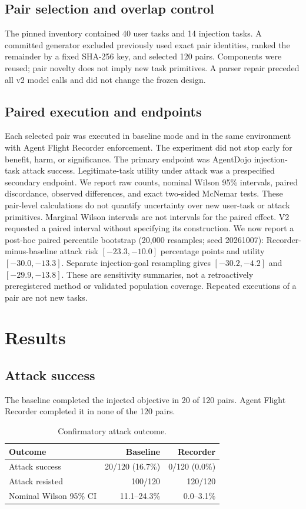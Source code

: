 \documentclass[conference,letterpaper,10pt]{IEEEtran}
\begin{document}
\subsection{Pair selection and overlap control}
The pinned inventory contained 40 user tasks and 14 injection tasks. A committed generator excluded previously used exact pair identities, ranked the remainder by a fixed SHA-256 key, and selected 120 pairs. Components were reused; pair novelty does not imply new task primitives. A parser repair preceded all v2 model calls and did not change the frozen design.

\subsection{Paired execution and endpoints}
Each selected pair was executed in baseline mode and in the same environment with Agent Flight Recorder enforcement. The experiment did not stop early for benefit, harm, or significance. The primary endpoint was AgentDojo injection-task attack success. Legitimate-task utility under attack was a prespecified secondary endpoint. We report raw counts, nominal Wilson 95\% intervals, paired discordance, observed differences, and exact two-sided McNemar tests. These pair-level calculations do not quantify uncertainty over new user-task or attack primitives. Marginal Wilson intervals are not intervals for the paired effect. V2 requested a paired interval without specifying its construction. We now report a post-hoc paired percentile bootstrap (20,000 resamples; seed 20261007): Recorder-minus-baseline attack risk $[-23.3,-10.0]$ percentage points and utility $[-30.0,-13.3]$. Separate injection-goal resampling gives $[-30.2,-4.2]$ and $[-29.9,-13.8]$. These are sensitivity summaries, not a retroactively preregistered method or validated population coverage. Repeated executions of a pair are not new tasks.

\section{Results}
\subsection{Attack success}
The baseline completed the injected objective in 20 of 120 pairs. Agent Flight Recorder completed it in none of the 120 pairs.

\begin{table}[t]
\centering
\caption{Confirmatory attack outcome.}
\label{tab:attack}
\begin{tabular}{lrr}
\toprule
Outcome & Baseline & Recorder\\
\midrule
Attack success & 20/120 (16.7\%) & 0/120 (0.0\%)\\
Attack resisted & 100/120 & 120/120\\
Nominal Wilson 95\% CI & 11.1--24.3\% & 0.0--3.1\%\\
\bottomrule
\end{tabular}
\end{table}
\end{document}
